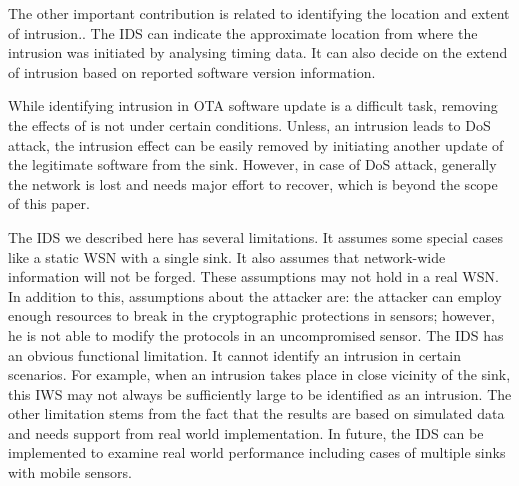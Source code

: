 \documentclass[conference,manuscript]{IEEEtran}
\begin{document}
The other important contribution is related to identifying the location and extent of intrusion..
The IDS can indicate the approximate location from where the intrusion was initiated by analysing timing data.
It can also decide on the extend of intrusion based on reported software version information.

While identifying intrusion in OTA software update is a difficult task, removing the effects of is not under certain conditions.
Unless, an intrusion leads to DoS attack, the intrusion effect can be easily removed by initiating another update of the legitimate software from the sink.
However, in case of DoS attack, generally the network is lost and needs major effort to recover, which is beyond the scope of this paper.

The IDS we described here has several limitations. 
It assumes some special cases like a static WSN with a single sink.
It also assumes that network-wide information will not be forged. %
These assumptions may not hold in a real WSN.
In addition to this, assumptions about the attacker are: the attacker can employ enough resources to break in the cryptographic protections in sensors; however, he is not able to modify the protocols in an uncompromised sensor.
The IDS has an obvious functional limitation.
It cannot identify an intrusion in certain scenarios.
For example, when an intrusion takes place in close vicinity of the sink, this IWS may not always be sufficiently large to be identified as an intrusion.
The other limitation stems from the fact that the results are based on simulated data and needs support from real world implementation.
In future,  the IDS can be implemented to examine real world performance including cases of multiple sinks with mobile sensors.
\end{document}
